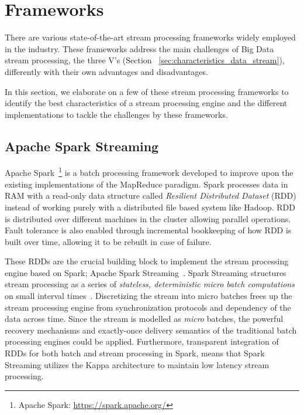 \section{Frameworks}
\label{sec:frameworks}
There are various state-of-the-art stream processing frameworks widely employed
in the industry. These frameworks address the main challenges of 
Big Data stream processing, the three V's (Section ~\ref{sec:characteristics_data_stream}),
differently with their own advantages and disadvantages.

In this section, we elaborate 
on a few of these stream processing frameworks to identify the best characteristics of a 
stream processing engine and the different implementations to tackle the challenges by these 
frameworks.



\subsection{Apache Spark Streaming}%
\label{sub:Apache Spark}
Apache Spark~\footnote{Apache Spark: \url{https://spark.apache.org/}} is a batch 
processing framework developed to improve upon the existing implementations of the 
MapReduce paradigm. Spark processes data in RAM with a read-only data structure called 
\emph{Resilient Distributed Dataset} (RDD) instead of working purely with a distributed file based system like 
Hadoop. RDD is distributed over 
different machines in the cluster allowing parallel operations. Fault tolerance 
is also enabled through incremental bookkeeping of how RDD is built over time, allowing 
it to be rebuilt in case of failure.

These RDDs are the crucial building block to implement the stream processing engine 
based on Spark; Apache Spark Streaming~\cite{spark_streaming}. Spark Streaming structures
stream processing as a series of \emph{stateless, deterministic micro batch
computations} on small interval times~\cite{spark_streaming}. Discretizing the stream 
into micro batches frees up the stream processing engine from synchronization protocols 
and dependency of the data across time. Since the stream is modelled as \emph{micro} 
batches, the powerful recovery mechanisms and exactly-once delivery semantics of the traditional batch processing engines could
be applied. 
Furthermore, transparent integration of RDDs for both batch and stream processing in Spark,  
means that Spark Streaming utilizes the Kappa architecture to maintain low latency stream processing. 

